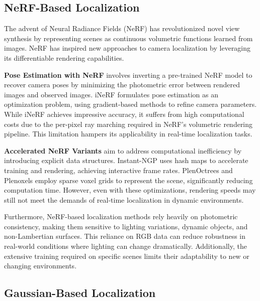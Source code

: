\documentclass[twocolumn]{article} %
\begin{document}
\subsection{NeRF-Based Localization}\label{nerf-based-localization}

The advent of Neural Radiance Fields (NeRF)
\cite{mildenhallNeRFRepresentingScenes2022} has revolutionized novel
view synthesis by representing scenes as continuous volumetric functions
learned from images. NeRF has inspired new approaches to camera
localization by leveraging its differentiable rendering capabilities.

\textbf{Pose Estimation with NeRF} involves inverting a pre-trained NeRF
model to recover camera poses by minimizing the photometric error
between rendered images and observed images. iNeRF
\cite{yen-chenInerfInvertingNeural2021} formulates pose estimation
as an optimization problem, using gradient-based methods to refine
camera parameters. While iNeRF achieves impressive accuracy, it suffers
from high computational costs due to the per-pixel ray marching required
in NeRF's volumetric rendering pipeline. This limitation hampers its
applicability in real-time localization tasks.

\textbf{Accelerated NeRF Variants} aim to address computational
inefficiency by introducing explicit data structures. Instant-NGP
\cite{mullerInstantNeuralGraphics2022} uses hash maps to accelerate
training and rendering, achieving interactive frame rates. PlenOctrees
\cite{yuPlenoctreesRealtimeRendering2021} and Plenoxels
\cite{fridovich-keilPlenoxelsRadianceFields2022} employ sparse voxel
grids to represent the scene, significantly reducing computation time.
However, even with these optimizations, rendering speeds may still not
meet the demands of real-time localization in dynamic environments.

Furthermore, NeRF-based localization methods rely heavily on photometric
consistency, making them sensitive to lighting variations, dynamic
objects, and non-Lambertian surfaces. This reliance on RGB data can
reduce robustness in real-world conditions where lighting can change
dramatically. Additionally, the extensive training required on specific
scenes limits their adaptability to new or changing environments.

\subsection{Gaussian-Based
Localization}\label{gaussian-based-localization}
\end{document}
